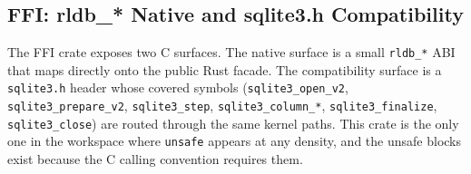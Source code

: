 \subsection{FFI: rldb\_* Native and sqlite3.h Compatibility}
The FFI crate exposes two C surfaces. The native surface is a small
\texttt{rldb\_*} ABI that maps directly onto the public Rust facade.
The compatibility surface is a \texttt{sqlite3.h} header whose
covered symbols (\texttt{sqlite3\_open\_v2}, \texttt{sqlite3\_prepare\_v2},
\texttt{sqlite3\_step}, \texttt{sqlite3\_column\_*}, \texttt{sqlite3\_finalize},
\texttt{sqlite3\_close}) are routed through the same kernel paths.
This crate is the only one in the workspace where \texttt{unsafe}
appears at any density, and the unsafe blocks exist because the C
calling convention requires them.
